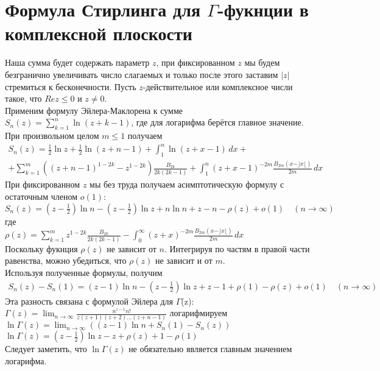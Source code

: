 \documentclass{report}
\begin{document}
\section{Формула Стирлинга для $\Gamma$-фукнции в комплексной плоскости}
Наша сумма будет содержать параметр $z$, при фиксированном $z$ мы будем безгранично увеличивать число слагаемых и только после этого заставим $|z|$ стремиться к бесконечности.
Пусть $z$-действительное или комплексное числи такое, что $Re{z}\le0$ и $z\neq{0}$. \\
Применим формулу Эйлера-Маклорена к сумме \\
$S_n(z)=\sum_{k=1}^{n}\ln(z+k-1)$, где для логарифма берётся главное значение. \\
При произвольном целом $m\le{1}$ получаем \\
\begin{multline}
S_n(z)=\frac{1}{2}\ln{z}+\frac{1}{2}\ln(z+n-1)+\int_{1}^{n}\ln(z+x-1)\,dx+ \\
+\sum_{k=1}^{m}((z+n-1)^{1-2k}-z^{1-2k})\frac{B_{2k}}{2k(2k-1)}+\int_{1}^{n}(z+x-1)^{-2m}\frac{B_{2m}(x-\rfloor{x}\lfloor)}{2m}\,dx
\end{multline}
При фиксированном $z$ мы без труда получаем асимптотическую формулу с остаточным членом $o(1)$:
$S_n(z)=\left(z-\frac{1}{2}\right)\ln{n}-\left(z-\frac{1}{2}\right)\ln{z}+n\ln{n}+z-n-\rho(z)+o(1)\quad(n\to\infty)$ \\
где \\
$\rho(z)=\sum_{k=1}^{m}z^{1-2k}\frac{B_{2k}}{2k(2k-1)}-\int_{0}^{\infty}(z+x)^{-2m}\frac{B_{2m}(x-\rfloor{x}\lfloor)}{2m}\,dx$ \\
Поскольку фукнция $\rho(z)$ не зависит от $n$. Интегрируя по частям в правой части равенства, можно убедиться, что $\rho(z)$ не зависит и от $m$. \\
Используя полученные формулы, получим \\
\begin{multline}
S_n(z)-S_n(1)=(z-1)\ln{n}-\left(z-\frac{1}{2}\right)\ln{z}+z-1+\rho(1)-\rho(z)+o(1)\quad(n\to\infty)
\end{multline} 
Эта разность связана с формулой Эйлера для $\Gamma$(z): \\
$\Gamma(z)=\lim_{n\to\infty}\frac{n^{z-1}n!}{z(z+1)(z+2)\dots(z+n-1)}$
логарифмируем \\
$\ln\Gamma(z)=\lim_{n\to\infty}((z-1)\ln{n}+S_n(1)-S_n(z))$ \\
$\ln\Gamma(z)=\left(z-\frac{1}{2}\right)\ln{z}-z+\rho(z)+1-\rho(1)$ \\
Следует заметить, что $\ln\Gamma(z)$  не обязательно является главным значением логарифма. \\
\end{document}
